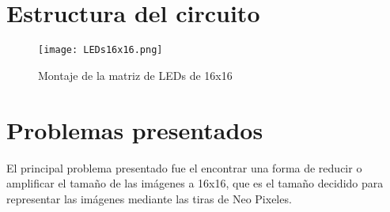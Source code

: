 \documentclass{article}
\begin{document}
\newpage
\section{Estructura del circuito} \label{circuito}

\begin{figure}[h]
\texttt{[image: LEDs16x16.png]}
\centering
\caption{Montaje de la matriz de LEDs de 16x16}
\label{fig:punto1}
\end{figure}

\newpage
\section{Problemas presentados} \label{problemas}
El principal problema presentado fue el encontrar una forma de reducir o amplificar el tamaño de las imágenes a 16x16, que es el tamaño decidido para representar las imágenes mediante las tiras de Neo Pixeles.
\end{document}
